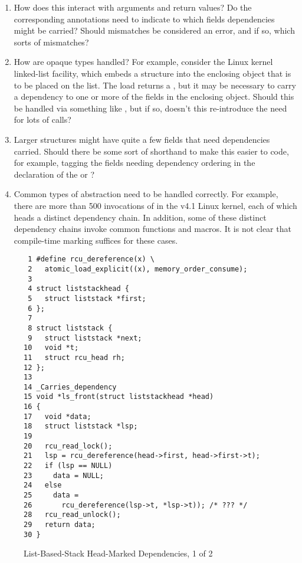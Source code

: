 \documentclass[letterpaper,twocolumn,10pt]{article}
\begin{document}
\begin{enumerate}
\item	How does this interact with arguments and return values?
	Do the corresponding annotations need to indicate to which
	fields dependencies might be carried?
	Should mismatches be considered an error, and if so, which
	sorts of mismatches?
\item	How are opaque types handled?
	For example, consider the Linux kernel linked-list facility,
	which embeds a  structure into the enclosing
	object that is to be placed on the list.
	The  load returns a ,
	but it may be necessary to carry a dependency to one or more of
	the fields in the enclosing object.
	Should this be handled via something like
	,
	but if so, doesn't this re-introduce the need for lots of
	 calls?
\item	Larger structures might have quite a few fields that need
	dependencies carried.
	Should there be some sort of shorthand to make this easier
	to code, for example, tagging the fields needing dependency
	ordering in the declaration of the  or ?
\item	Common types of abstraction need to be handled correctly.
	For example, there are more than 500 invocations of
	 in the v4.1 Linux kernel,
	each of which heads a distinct dependency chain.
	In addition, some of these distinct dependency chains invoke
	common functions and macros.
	It is not clear that compile-time marking suffices for these
	cases.
\end{enumerate}

\begin{figure}[tbp]
{ \scriptsize
\begin{verbatim}
 1 #define rcu_dereference(x) \
 2   atomic_load_explicit((x), memory_order_consume);
 3 
 4 struct liststackhead {
 5   struct liststack *first;
 6 };
 7 
 8 struct liststack {
 9   struct liststack *next;
10   void *t;
11   struct rcu_head rh;
12 };
13 
14 _Carries_dependency
15 void *ls_front(struct liststackhead *head)
16 {
17   void *data;
18   struct liststack *lsp;
19 
20   rcu_read_lock();
21   lsp = rcu_dereference(head->first, head->first->t);
22   if (lsp == NULL)
23     data = NULL;
24   else
25     data =
26       rcu_dereference(lsp->t, *lsp->t)); /* ??? */
28   rcu_read_unlock();
29   return data;
30 }
\end{verbatim}
}
\caption{List-Based-Stack Head-Marked Dependencies, 1 of 2}
\label{fig:List-Based-Stack Head-Marked Dependencies, 1 of 2}
\end{figure}
\end{document}
